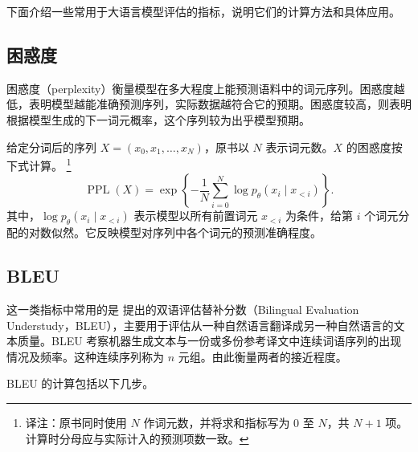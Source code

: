 下面介绍一些常用于大语言模型评估的指标，说明它们的计算方法和具体应用。

\subsection{困惑度}
困惑度（perplexity）衡量模型在多大程度上能预测语料中的词元序列。困惑度越低，表明模型越能准确预测序列，实际数据越符合它的预期。困惑度较高，则表明根据模型生成的下一词元概率，这个序列较为出乎模型预期。

给定分词后的序列 $X=(x_0,x_1,\ldots,x_N)$，原书以 $N$ 表示词元数。$X$ 的困惑度按下式计算。%
\footnote{译注：原书同时使用 $N$ 作词元数，并将求和指标写为 $0$ 至 $N$，共 $N+1$ 项。计算时分母应与实际计入的预测项数一致。}
\begin{equation}
\operatorname{PPL}(X)=\exp\!\left\{-\frac{1}{N}
 \sum_{i=0}^{N}\log p_\theta(x_i\mid x_{<i})\right\}.
\label{eq:ch08-perplexity}
\end{equation}
其中，$\log p_\theta(x_i\mid x_{<i})$ 表示模型以所有前置词元 $x_{<i}$ 为条件，给第 $i$ 个词元分配的对数似然。它反映模型对序列中各个词元的预测准确程度。

\subsection{BLEU}
这一类指标中常用的是 提出的双语评估替补分数（Bilingual Evaluation Understudy，BLEU），主要用于评估从一种自然语言翻译成另一种自然语言的文本质量。BLEU 考察机器生成文本与一份或多份参考译文中连续词语序列的出现情况及频率。这种连续序列称为 $n$ 元组。由此衡量两者的接近程度。

BLEU 的计算包括以下几步。

